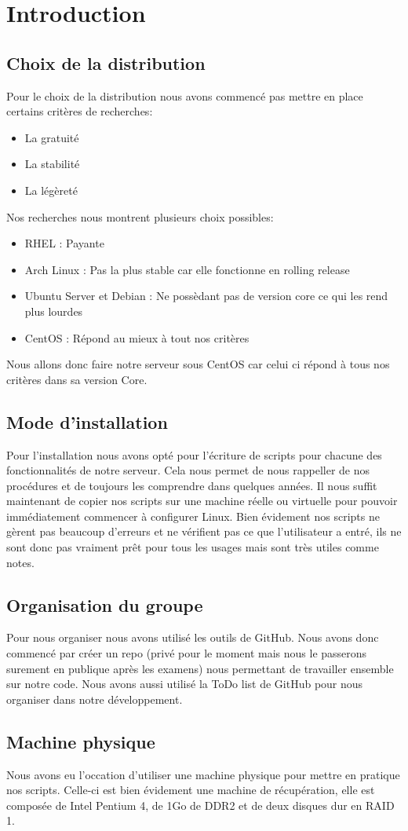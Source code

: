 \section{Introduction}
\subsection{Choix de la distribution}
Pour le choix de la distribution nous avons commencé pas mettre en place certains critères de recherches:
\begin{itemize}
	\item La gratuité
	\item La stabilité
	\item La légèreté
\end{itemize}
Nos recherches nous montrent plusieurs choix possibles:
\begin{itemize}
	\item RHEL : Payante
	\item Arch Linux : Pas la plus stable car elle fonctionne en rolling release
	\item Ubuntu Server et Debian : Ne possèdant pas de version core ce qui les rend plus lourdes
	\item CentOS : Répond au mieux à tout nos critères
\end{itemize}
Nous allons donc faire notre serveur sous CentOS car celui ci répond à tous nos critères dans sa version Core.

\subsection{Mode d'installation}
Pour l'installation nous avons opté pour l'écriture de scripts pour chacune des fonctionnalités de notre serveur. Cela nous permet de nous rappeller de nos procédures et de toujours les comprendre dans quelques années.
Il nous suffit maintenant de copier nos scripts sur une machine réelle ou virtuelle pour pouvoir immédiatement commencer à configurer Linux.
Bien évidement nos scripts ne gèrent pas beaucoup d'erreurs et ne vérifient pas ce que l'utilisateur a entré, ils ne sont donc pas vraiment prêt pour tous les usages mais sont très utiles comme notes.

\subsection{Organisation du groupe}
Pour nous organiser nous avons utilisé les outils de GitHub. Nous avons donc commencé par créer un repo (privé pour le moment mais nous le passerons surement en publique après les examens) nous permettant de travailler ensemble sur notre code. Nous avons aussi utilisé la ToDo list de GitHub pour nous organiser dans notre développement.

\subsection{Machine physique}
Nous avons eu l'occation d'utiliser une machine physique pour mettre en pratique nos scripts. Celle-ci est bien évidement une machine de récupération, elle est composée de Intel Pentium 4, de 1Go de DDR2 et de deux disques dur en RAID 1.
